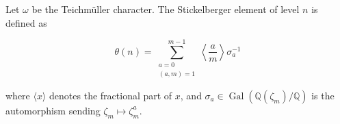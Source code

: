 Let $\omega$ be the Teichmüller character. The Stickelberger element of level $n$ is defined as

$$\theta(n) = \sum_{\substack{a=0 \\ (a,m)=1}}^{m-1} \left\langle \frac{a}{m} \right\rangle \sigma_a^{-1}$$

where $\langle x \rangle$ denotes the fractional part of $x$, and $\sigma_a \in \operatorname{Gal}(\mathbb{Q}(\zeta_m)/\mathbb{Q})$ is the automorphism sending $\zeta_m \mapsto \zeta_m^a$.
